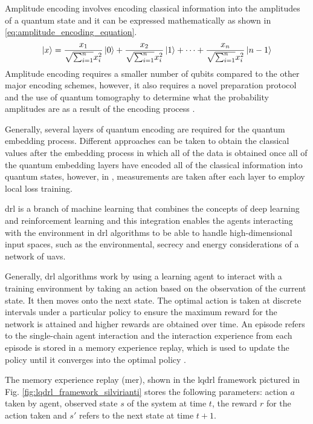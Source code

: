 Amplitude encoding involves encoding classical information into the amplitudes of a quantum state and it can be expressed mathematically as shown in \ref{eq:amplitude_encoding_equation}. 
\begin{equation} \label{eq:amplitude_encoding_equation}
    \ket{x} = \frac{x_1}{\sqrt{\sum_{i=1}^{n}}x_i^2}\ket{0} + \frac{x_2}{\sqrt{\sum_{i=1}^{n}}x_i^2}\ket{1} + \dots + \frac{x_n}{\sqrt{\sum_{i=1}^{n}}x_i^2}\ket{n-1}
\end{equation}
Amplitude encoding requires a smaller number of qubits compared to the other major encoding schemes, however, it also requires a novel preparation protocol and the use of quantum tomography to determine what the probability amplitudes are as a result of the encoding process \cite{munikote_comparing_2024, rath_quantum_2023}.

Generally, several layers of quantum encoding are required for the quantum embedding process. 
Different approaches can be taken to obtain the classical values after the embedding process in which all of the data is obtained once all of the quantum embedding layers have encoded all of the classical information into quantum states, however, in \cite{silvirianti_layerwise_2024}, measurements are taken after each layer to employ local loss training. 

\acrshort{drl} is a branch of machine learning that combines the concepts of deep learning and reinforcement learning and this integration enables the agents interacting with the environment in \acrshort{drl} algorithms to be able to handle high-dimensional input spaces, such as the environmental, secrecy and energy considerations of a network of \acrshort{uav}s. 

Generally, \acrshort{drl} algorithms work by using a learning agent to interact with a training environment by taking an action based on the observation of the current state. 
It then moves onto the next state. 
The optimal action is taken at discrete intervals under a particular policy to ensure the maximum reward for the network is attained and higher rewards are obtained over time. 
An episode refers to the single-chain agent interaction and the interaction experience from each episode is stored in a memory experience replay, which is used to update the policy until it converges into the optimal policy \cite{silvirianti_layerwise_2024}. 

The memory experience replay (\acrshort{mer}), shown in the \acrshort{lqdrl} framework pictured in Fig. \ref{fig:lqdrl_framework_silvirianti} stores the following parameters: action $a$ taken by agent, observed state $s$ of the system at time $t$, the reward $r$ for the action taken and $s'$ refers to the next state at time $t+1$.


